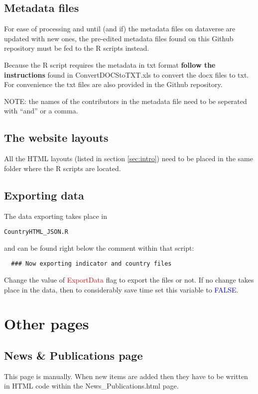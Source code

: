 \documentclass[a4paper]{article}
\begin{document}
\subsection{Metadata files}

For ease of processing and until (and if) the metadata files on dataverse are updated 
with new ones, the pre-edited metadata files found on this Github repository 
must be fed to the R scripts instead.

Because the R script requires the metadata in txt format \textbf{follow the instructions} found in ConvertDOCStoTXT.xls to convert the docx files to txt. For convenience the txt files are also provided in the Github repository.

NOTE: the names of the contributors in the metadata file need to be seperated with ``and'' or a comma.

\subsection{The website layouts}

All the HTML layouts (listed in section \ref{sec:intro}) need to be placed in 
the same folder where the R scripts are located.

\subsection{Exporting data}
 The data exporting takes place in 
\begin{verbatim}CountryHTML_JSON.R\end{verbatim} and can 
be found right below the comment within that script: 
 \begin{verbatim}
  ### Now exporting indicator and country files
 \end{verbatim}

Change the value of \textcolor{red}{ExportData} flag to export the files or 
not. If no change takes place in the data, then to considerably save time set 
this variable to \textcolor{blue}{FALSE}.

\section{Other pages}
\subsection{News \& Publications page}
This page is manually. When new items are added then they have to be 
written in HTML code within the News\_Publications.html page.
\end{document}
